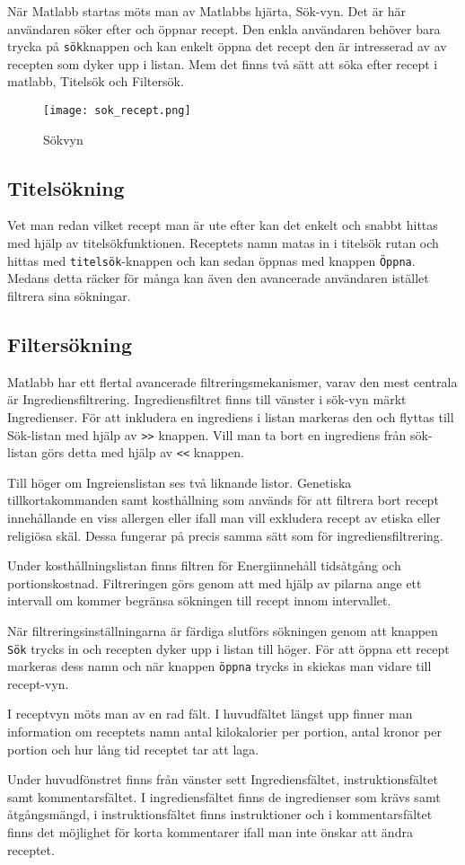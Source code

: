 När Matlabb startas möts man av Matlabbs hjärta, Sök-vyn. Det är här
användaren söker efter och öppnar recept. Den enkla användaren behöver
bara trycka på \verb+sök+knappen och kan enkelt öppna det recept den är
intresserad av av recepten som dyker upp i listan. Mem det finns två
sätt att söka efter recept i matlabb, Titelsök och Filtersök.


\begin{figure}[h]
        \centering 
        \texttt{[image: sok\_recept.png]} 
        \caption{Sökvyn} 
        \label{fig:sokvyn}
\end{figure}


\subsection{Titelsökning}
Vet man redan vilket recept man är ute efter kan det enkelt och snabbt
hittas med hjälp av titelsökfunktionen. Receptets namn matas in i
titelsök rutan och hittas med \verb+titelsök+-knappen och kan sedan öppnas
med knappen \verb+Öppna+. Medans detta räcker för många kan även den
avancerade användaren istället filtrera sina sökningar.

\subsection{Filtersökning}

Matlabb har ett flertal avancerade filtreringsmekanismer, varav den
mest centrala är Ingrediensfiltrering. Ingrediensfiltret finns till
vänster i sök-vyn märkt Ingredienser. För att inkludera en ingrediens
i listan markeras den och flyttas till Sök-listan med hjälp av \verb+>>+
knappen. Vill man ta bort en ingrediens från sök-listan görs detta med
hjälp av \verb+<<+ knappen.

Till höger om Ingreienslistan ses två liknande listor. Genetiska
tillkortakommanden samt kosthållning som används för att filtrera bort
recept innehållande en viss allergen eller ifall man vill exkludera
recept av etiska eller religiösa skäl. Dessa fungerar på precis samma
sätt som för ingrediensfiltrering.

Under kosthållningslistan finns filtren för Energiinnehåll tidsåtgång
och portionskostnad. Filtreringen görs genom att med hjälp av pilarna
ange ett intervall om kommer begränsa sökningen till recept innom
intervallet.

När filtreringsinställningarna är färdiga slutförs sökningen genom att
knappen \verb+Sök+ trycks in och recepten dyker upp i listan till höger. För
att öppna ett recept markeras dess namn och när knappen \verb+öppna+ trycks
in skickas man vidare till recept-vyn.  

I receptvyn möts man av en rad fält. I huvudfältet längst upp finner
man information om receptets namn antal kilokalorier per portion,
antal kronor per portion och hur lång tid receptet tar att laga.

Under huvudfönstret finns från vänster sett Ingrediensfältet,
instruktionsfältet samt kommentarsfältet. I ingrediensfältet finns de
ingredienser som krävs samt åtgångsmängd, i instruktionsfältet finns
instruktioner och i kommentarsfältet finns det möjlighet för korta
kommentarer ifall man inte önskar att ändra receptet.
